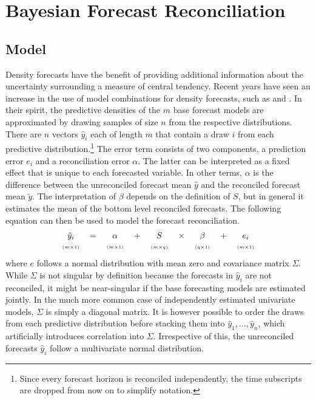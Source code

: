 \documentclass[a4paper,fleqn,11pt]{article}
\begin{document}
\clearpage

\section{Bayesian Forecast Reconciliation}
\label{sec:model}
\subsection{Model}
Density forecasts have the benefit of providing additional information about the uncertainty surrounding a measure of central tendency. Recent years have seen an increase in the use of model combinations for density forecasts, such as \cite{Kapetanios2015} and \cite{Cesur2016}. In their spirit, the predictive densities of the $m$ base forecast models are approximated by drawing samples of size $n$ from the respective distributions. There are $n$ vectors $\hat{y}_{i}$ each of length $m$ that contain a draw $i$ from each predictive distribution.\footnote{Since every forecast horizon is reconciled independently, the time subscripts are dropped from now on to simplify notation.} The error term consists of two components, a prediction error $e_{i}$ and a reconciliation error $\alpha$. The latter can be interpreted as a fixed effect that is unique to each forecasted variable. In other terms, $\alpha$ is the difference between the unreconciled forecast mean $\hat{y}$ and the reconciled forecast mean $\tilde{y}$. The interpretation of $\beta$ depends on the definition of $S$, but in general it estimates the mean of the bottom level reconciled forecasts. The following equation can then be used to model the forecast reconciliation.
\begin{align}
\label{eq:main}
\begin{tabular}{ccccccccc}
	$\hat{y}_i$ & $=$ & $\alpha$ & + &$S$ & $\times$ & $\beta$ & $+$ & $e_i$ \\
	$\scriptscriptstyle (m\times 1)$ & & $\scriptscriptstyle (m\times 1)$  & & $ \scriptscriptstyle (m\times q) $ & & $\scriptscriptstyle (q\times 1)$ & & $\scriptscriptstyle (m\times 1)$
\end{tabular}
\end{align}
where $e$ follows a normal distribution with mean zero and covariance matrix $\Sigma$. While $\Sigma$ is not singular by definition because the forecasts in $\hat{y}_{i}$ are not reconciled, it might be near-singular if the base forecasting models are estimated jointly. In the much more common case of independently estimated univariate models, $\Sigma$ is simply a diagonal matrix. It is however possible to order the draws from each predictive distribution before stacking them into $\hat{y}_{1},\hdots,\hat{y}_{n}$, which artificially introduces correlation into $\Sigma$. Irrespective of this, the unreconciled forecasts $\hat{y}_{i}$ follow a multivariate normal distribution.
\end{document}
